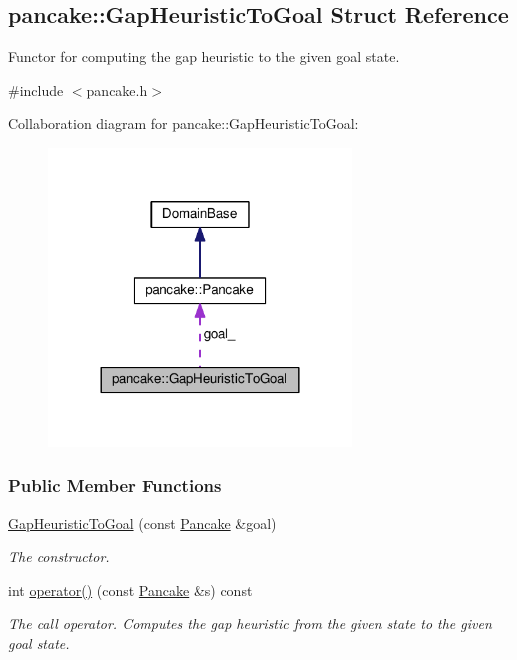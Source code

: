 \hypertarget{structpancake_1_1GapHeuristicToGoal}{}\subsection{pancake\+:\+:Gap\+Heuristic\+To\+Goal Struct Reference}
\label{structpancake_1_1GapHeuristicToGoal}


Functor for computing the gap heuristic to the given goal state.  




{\ttfamily \#include $<$pancake.\+h$>$}



Collaboration diagram for pancake\+:\+:Gap\+Heuristic\+To\+Goal\+:\nopagebreak
\begin{figure}[H]
\begin{center}
\leavevmode
\includegraphics[width=228pt]{structpancake_1_1GapHeuristicToGoal__coll__graph}
\end{center}
\end{figure}
\subsubsection*{Public Member Functions}
\begin{DoxyCompactItemize}
\item 
\hyperlink{structpancake_1_1GapHeuristicToGoal_a8702573f7ed5676f2e88f27410b76896}{Gap\+Heuristic\+To\+Goal} (const \hyperlink{structpancake_1_1Pancake}{Pancake} \&goal)
\begin{DoxyCompactList}\small\item\em The constructor. \end{DoxyCompactList}\item 
int \hyperlink{structpancake_1_1GapHeuristicToGoal_a733a213c894455df1398dc91248ae10c}{operator()} (const \hyperlink{structpancake_1_1Pancake}{Pancake} \&s) const 
\begin{DoxyCompactList}\small\item\em The call operator. Computes the gap heuristic from the given state to the given goal state. \end{DoxyCompactList}\end{DoxyCompactItemize}
